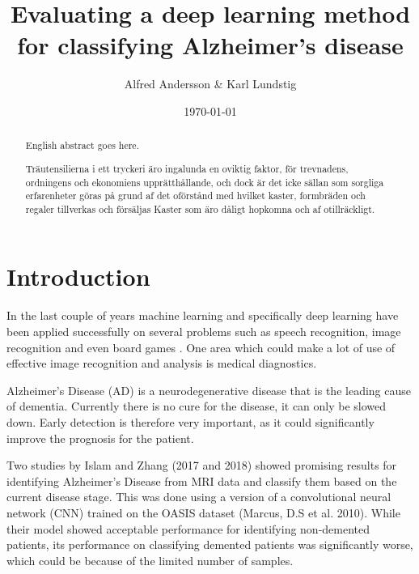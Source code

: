 \documentclass{kththesis}
\title{Evaluating a deep learning method for classifying Alzheimer's disease}
\author{Alfred Andersson \& Karl Lundstig}
\date{\today}
\begin{document}
\frontmatter

\titlepage

\begin{abstract}
  English abstract goes here.

\end{abstract}


\begin{otherlanguage}{swedish}
  \begin{abstract}
    Träutensilierna i ett tryckeri äro ingalunda en oviktig faktor,
    för trevnadens, ordningens och ekonomiens upprätthållande, och
    dock är det icke sällan som sorgliga erfarenheter göras på grund
    af det oförstånd med hvilket kaster, formbräden och regaler
    tillverkas och försäljas Kaster som äro dåligt hopkomna och af
    otillräckligt.
  \end{abstract}
\end{otherlanguage}


\tableofcontents


\mainmatter


\chapter{Introduction}

In the last couple of years machine learning and specifically deep learning have been applied successfully on several problems such as speech recognition, image recognition \parencite{krizhevsky2012imagenet} and even board games \parencite{silver2018general}. One area which could make a lot of use of effective image recognition and analysis is medical diagnostics.

Alzheimer’s Disease (AD) is a neurodegenerative disease that is the leading cause of dementia. Currently there is no cure for the disease, it can only be slowed down. Early detection is therefore very important, as it could significantly improve the prognosis for the patient.

Two studies by Islam and Zhang (2017 and 2018) showed promising results for identifying Alzheimer’s Disease from MRI data and classify them based on the current disease stage. This was done using a version of a convolutional neural network (CNN) trained on the OASIS dataset (Marcus, D.S et al. 2010). While their model showed acceptable performance for identifying non-demented patients, its performance on classifying demented patients was significantly worse, which could be because of the limited number of samples. 
\end{document}
